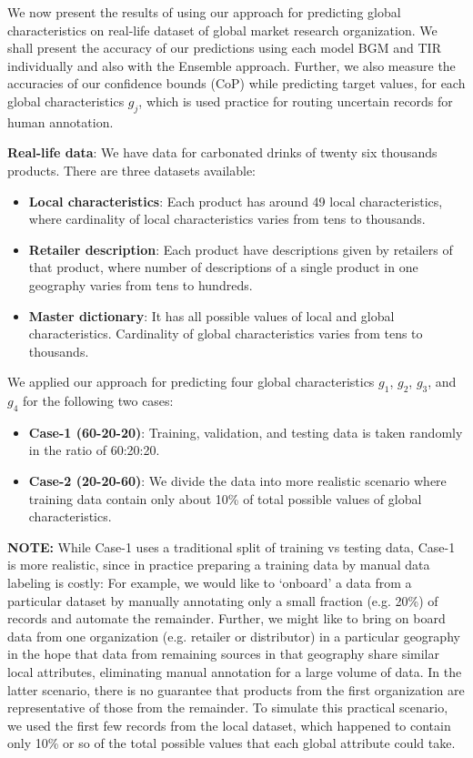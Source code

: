 We now present the results of using our approach for predicting global characteristics on real-life dataset of global market research organization. We 
shall present the accuracy of our predictions using each model BGM and TIR individually and also with the Ensemble approach. Further, we 
also measure the accuracies of our confidence bounds (CoP) while predicting target values, for each global characteristics $g_j$,
which is used practice for routing uncertain records for human annotation.

\textbf{Real-life data}: We have data for carbonated drinks of twenty six thousands products. There are three datasets available:
\begin{itemize}
 \item \textbf{Local characteristics}: Each product has around 49 local characteristics, where cardinality of local characteristics varies from tens to thousands.
 \item \textbf{Retailer description}: Each product have descriptions given by retailers of that product, where number of descriptions of a single product in one geography varies from tens to hundreds.
 \item\textbf{Master dictionary}: It has all possible values of local and global characteristics. Cardinality of global characteristics  varies from tens to thousands.
\end{itemize}

We applied our approach for predicting four global characteristics $g_1$, $g_2$, $g_3$, and $g_4$ for the following two cases:
\begin{itemize}
 \item\textbf{Case-1 (60-20-20)}: Training, validation, and testing data is taken randomly in the ratio of 60:20:20.
 \item\textbf{Case-2 (20-20-60)}: We divide the data into more realistic scenario where training data contain only about 10\% of total possible values of global characteristics. 
 
 \end{itemize}
\textbf{NOTE:} While Case-1 uses a traditional split of training vs testing data, Case-1 is more realistic, since in practice preparing a training data by manual data labeling is costly: For example, we would like to `onboard' a data from a particular dataset 
by manually annotating only a small fraction (e.g. 20\%) of records and automate the remainder. Further, we might like to bring on board 
data from one organization (e.g. retailer or distributor) in a particular geography in the hope that data from remaining sources in that
geography share similar local attributes, eliminating manual annotation for a large volume of data. 
In the latter scenario, there is no guarantee that products from the first organization are representative of those from the remainder. 
To simulate this practical scenario, we used the first few records from the local dataset, which happened to contain only 10\% or so of the
total possible values that each global attribute could take.

